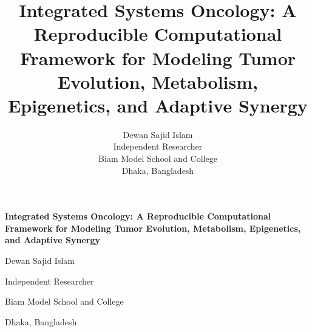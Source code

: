 \documentclass[12pt,a4paper]{article}
\title{\textbf{Integrated Systems Oncology: A Reproducible Computational Framework for Modeling Tumor Evolution, Metabolism, Epigenetics, and Adaptive Synergy}}
\author{Dewan Sajid Islam\orcidlink{0009-0008-8784-8480} \\ Independent Researcher \\ Biam Model School and College \\ Dhaka, Bangladesh}
\date{}
\begin{document}
\pagestyle{empty}

    \centering
    \vspace*{2cm}
    {\LARGE\bfseries Integrated Systems Oncology: A Reproducible Computational Framework for Modeling Tumor Evolution, Metabolism, Epigenetics, and Adaptive Synergy\par}
    \vspace{1.5cm}
    {\Large Dewan Sajid Islam\par}
    \vspace{0.3cm}
    {Independent Researcher\par}
    \vspace{0.1cm}
    {Biam Model School and College\par}
    \vspace{0.1cm}
    {Dhaka, Bangladesh\par}
    \vspace{2cm}
\end{document}
